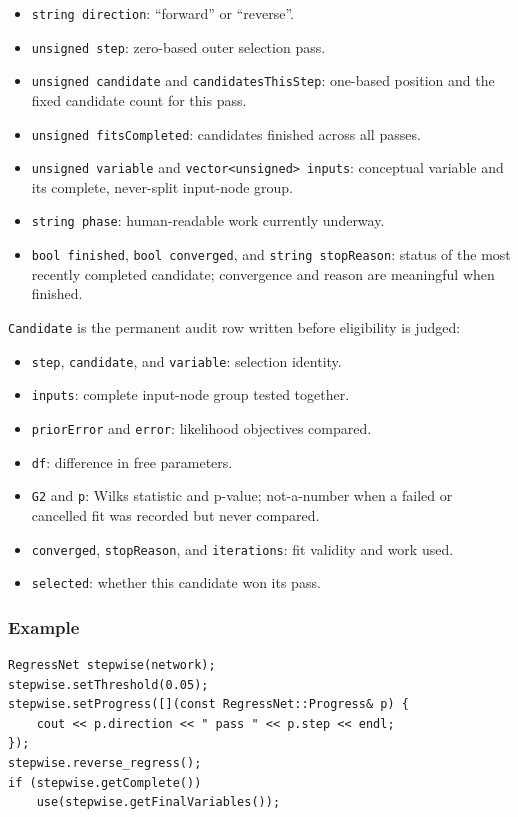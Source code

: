 \begin{itemize}
\item \texttt{string direction}: ``forward'' or ``reverse''.
\item \texttt{unsigned step}: zero-based outer selection pass.
\item \texttt{unsigned candidate} and \texttt{candidatesThisStep}: one-based
      position and the fixed candidate count for this pass.
\item \texttt{unsigned fitsCompleted}: candidates finished across all passes.
\item \texttt{unsigned variable} and \texttt{vector<unsigned> inputs}:
      conceptual variable and its complete, never-split input-node group.
\item \texttt{string phase}: human-readable work currently underway.
\item \texttt{bool finished}, \texttt{bool converged}, and
      \texttt{string stopReason}: status of the most recently completed
      candidate; convergence and reason are meaningful when finished.
\end{itemize}

\texttt{Candidate} is the permanent audit row written before eligibility is judged:

\begin{itemize}
\item \texttt{step}, \texttt{candidate}, and \texttt{variable}: selection identity.
\item \texttt{inputs}: complete input-node group tested together.
\item \texttt{priorError} and \texttt{error}: likelihood objectives compared.
\item \texttt{df}: difference in free parameters.
\item \texttt{G2} and \texttt{p}: Wilks statistic and p-value; not-a-number when
      a failed or cancelled fit was recorded but never compared.
\item \texttt{converged}, \texttt{stopReason}, and \texttt{iterations}: fit validity
      and work used.
\item \texttt{selected}: whether this candidate won its pass.
\end{itemize}

\subsubsection{Example}
\begin{verbatim}
RegressNet stepwise(network);
stepwise.setThreshold(0.05);
stepwise.setProgress([](const RegressNet::Progress& p) {
    cout << p.direction << " pass " << p.step << endl;
});
stepwise.reverse_regress();
if (stepwise.getComplete())
    use(stepwise.getFinalVariables());
\end{verbatim}


